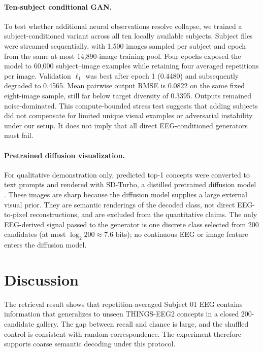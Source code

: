 \documentclass[10pt]{article}
\begin{document}
\paragraph{Ten-subject conditional GAN.}
To test whether additional neural observations resolve collapse, we trained a
subject-conditioned variant across all ten locally available subjects. Subject
files were streamed sequentially, with 1,500 images sampled per subject and
epoch from the same at-most 14,890-image training pool. Four epochs exposed
the model to 60,000 subject--image examples while retaining four averaged
repetitions per image.
Validation $\ell_1$ was best after epoch 1 (0.4480) and subsequently degraded
to 0.4565. Mean pairwise output RMSE is 0.0822 on the same fixed eight-image
sample, still far below target diversity of 0.3395. Outputs remained
noise-dominated. This compute-bounded stress test suggests that adding subjects
did not compensate for limited unique visual examples or adversarial
instability under our setup. It does not imply that all direct EEG-conditioned
generators must fail.

\paragraph{Pretrained diffusion visualization.}
For qualitative demonstration only, predicted top-1 concepts were converted
to text prompts and rendered with SD-Turbo, a distilled pretrained diffusion
model \cite{sauer2023add}. These images are sharp because the diffusion model
supplies a large external visual prior. They are semantic renderings of the
decoded class, not direct EEG-to-pixel reconstructions, and are excluded from
the quantitative claims. The only EEG-derived signal passed to the generator
is one discrete class selected from 200 candidates (at most
$\log_2 200\approx7.6$ bits); no continuous EEG or image feature enters the
diffusion model.

\section{Discussion}

The retrieval result shows that repetition-averaged Subject 01 EEG contains
information that generalizes to unseen THINGS-EEG2 concepts in a closed
200-candidate gallery. The gap between recall and chance is large, and the
shuffled control is consistent with random correspondence. The experiment
therefore supports coarse semantic decoding under this protocol.
\end{document}
